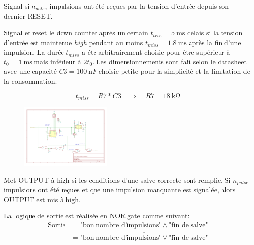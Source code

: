 \documentclass[french]{layout/Report}
\begin{document}
\begin{description}[leftmargin=!,labelwidth=4cm, labelindent=\parindent]
	\item[Down counter] Signal si $n_{pulse}$ impulsions ont été reçues par la tension d'entrée depuis son dernier RESET.
	\item[Missing pulse detector] Signal et reset le down counter après un certain $t_{true} = \SI{5}{\milli\second}$ délais si la tension d'entrée est maintenue \emph{high} pendant au moins $t_{miss} = \SI{1.8}{\milli\second}$ après la fin d'une impulsion. La durée $t_{miss}$ a été arbitrairement choisie pour être supérieur à $t_0 = \SI{1}{\milli\second}$ mais inférieur à $2t_0$. Les dimensionnements sont fait selon le datasheet \cite{TLC555} avec une capacité $\mathit{C3} = \SI{100}{\nano F}$ choisie petite pour la simplicité et la limitation de la consommation.

		\begin{equation*}
			t_{miss} = \mathit{R7}*\mathit{C3} \quad\Rightarrow\quad \mathit{R7} = \SI{18}{\kilo\ohm}
		\end{equation*}

		\begin{figure}[H]
			\centering
			\includegraphics[width=0.4\textwidth]{fig/decoder_reset_delay.pdf}
		\end{figure}


	\item[Logic] Met OUTPUT à high si les conditions d'une salve correcte sont remplie. Si $n_{pulse}$ impulsions ont été reçues et que une impulsion manquante est signalée, alors OUTPUT est mis à high. 

        La logique de sortie est réalisée en NOR gate comme suivant:
        \begin{align*}
        \text{Sortie} & = \text{"bon nombre d'impulsions"} \land \text{"fin de salve"} \\
        & = \overline{\overline{\text{"bon nombre d'impulsions"}} \lor \overline{\text{"fin de salve"}}}
        \end{align*}

\end{description}
\end{document}
